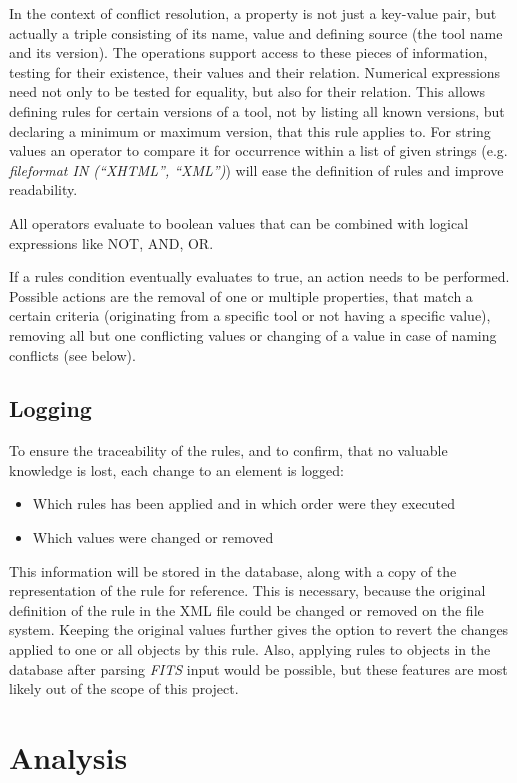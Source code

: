 \documentclass[a4paper,12pt]{article}
\begin{document}
In the context of conflict resolution, a property is not just a key-value pair, but actually a triple consisting of its name, value and defining source (the tool name and its version). The operations support access to these pieces of information, testing for their existence, their values and their relation. Numerical expressions need not only to be tested for equality, but also for their relation. This allows defining rules for certain versions of a tool, not by listing all known versions, but declaring a minimum or maximum version, that this rule applies to. For string values an operator to compare it for occurrence within a list of given strings (e.g. \emph{fileformat IN (``XHTML'', ``XML'')}) will ease the definition of rules and improve readability.

All operators evaluate to boolean values that can be combined with logical expressions like NOT, AND, OR.

If a rules condition eventually evaluates to true, an action needs to be performed. Possible actions are the removal of one or multiple properties, that match a certain criteria (originating from a specific tool or not having a specific value), removing all but one conflicting values or changing of a value in case of naming conflicts (see below). 






\subsection{Logging}


To ensure the traceability of the rules, and to confirm, that no valuable knowledge is lost, each change to an element is logged:
\begin{itemize}
\item Which rules has been applied and in which order were they executed
\item Which values were changed or removed
\end{itemize}

This information will be stored in the database, along with a copy of the representation of the rule for reference. This is necessary, because the original definition of the rule in the XML file could be changed or removed on the file system. Keeping the original values further gives the option to revert the changes applied to one or all objects by this rule. Also, applying rules to objects in the database after parsing \emph{FITS} input would be possible, but these features are most likely out of the scope of this project.


\section{Analysis}
\end{document}
